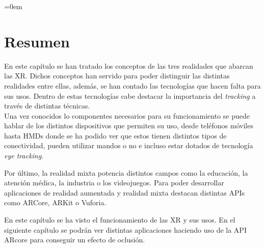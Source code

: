 \parindent=0em
\section*{Resumen}
\noindent

En este capítulo se han tratado los conceptos de las tres realidades que abarcan las XR. Dichos conceptos han servido para poder distinguir las distintas realidades entre ellas, además, se han contado las tecnologías que hacen falta para sus usos. Dentro de estas tecnologías cabe destacar la importancia del \textit{tracking} a través de distintas técnicas.\\

Una vez conocidos lo componentes necesarios para su funcionamiento se puede hablar de los distintos dispositivos que permiten su uso, desde teléfonos móviles hasta HMDs donde se ha podido ver que estos tienen distintos tipos de conectividad, pueden utilizar mandos o no e incluso estar dotados de tecnología \textit{eye tracking}.

Por último, la realidad mixta potencia distintos campos como la educación, la atención médica, la industria o los videojuegos. Para poder desarrollar aplicaciones de realidad aumentada y realidad mixta destacan distintas APIs como ARCore, ARKit o Vuforia.

En este capítulo se ha visto el funcionamiento de las XR y sus usos. En el siguiente capítulo se podrán ver distintas aplicaciones haciendo uso de la API ARcore para conseguir un efecto de oclusión.
